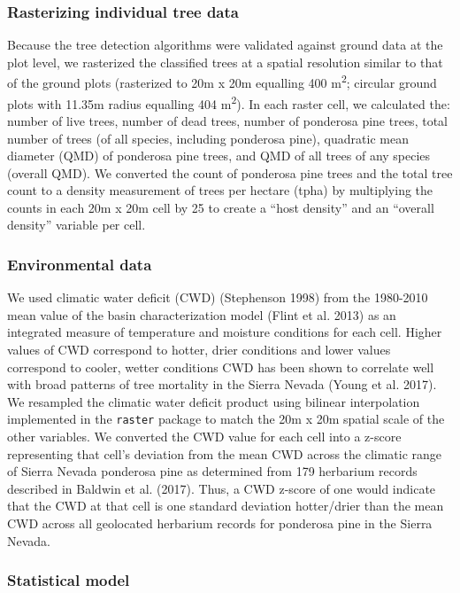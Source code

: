 \documentclass[]{article}
\begin{document}
\subsubsection{Rasterizing individual tree
data}\label{rasterizing-individual-tree-data}

Because the tree detection algorithms were validated against ground data
at the plot level, we rasterized the classified trees at a spatial
resolution similar to that of the ground plots (rasterized to 20m x 20m
equalling 400 m\textsuperscript{2}; circular ground plots with 11.35m
radius equalling 404 m\textsuperscript{2}). In each raster cell, we
calculated the: number of live trees, number of dead trees, number of
ponderosa pine trees, total number of trees (of all species, including
ponderosa pine), quadratic mean diameter (QMD) of ponderosa pine trees,
and QMD of all trees of any species (overall QMD). We converted the
count of ponderosa pine trees and the total tree count to a density
measurement of trees per hectare (tpha) by multiplying the counts in
each 20m x 20m cell by 25 to create a ``host density'' and an ``overall
density'' variable per cell.

\subsubsection{Environmental data}\label{environmental-data}

We used climatic water deficit (CWD) (Stephenson 1998) from the
1980-2010 mean value of the basin characterization model (Flint et al.
2013) as an integrated measure of temperature and moisture conditions
for each cell. Higher values of CWD correspond to hotter, drier
conditions and lower values correspond to cooler, wetter conditions CWD
has been shown to correlate well with broad patterns of tree mortality
in the Sierra Nevada (Young et al. 2017). We resampled the climatic
water deficit product using bilinear interpolation implemented in the
\texttt{raster} package to match the 20m x 20m spatial scale of the
other variables. We converted the CWD value for each cell into a z-score
representing that cell's deviation from the mean CWD across the climatic
range of Sierra Nevada ponderosa pine as determined from 179 herbarium
records described in Baldwin et al. (2017). Thus, a CWD z-score of one
would indicate that the CWD at that cell is one standard deviation
hotter/drier than the mean CWD across all geolocated herbarium records
for ponderosa pine in the Sierra Nevada.

\subsubsection{Statistical model}\label{statistical-model}
\end{document}
